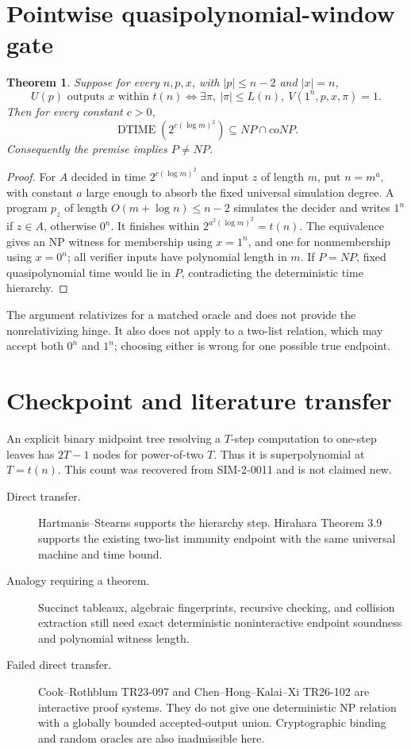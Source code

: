 \documentclass[11pt]{article}
\newtheorem{theorem}{Theorem}
\begin{document}
\section{Pointwise quasipolynomial-window gate}
\begin{theorem}
Suppose for every \(n,p,x\), with \(|p|\le n-2\) and \(|x|=n\),
\[
 U(p)\text{ outputs }x\text{ within }t(n)
 \Longleftrightarrow
 \exists\pi,\ |\pi|\le L(n),\ V(1^n,p,x,\pi)=1.
\]
Then for every constant \(c>0\),
\[
 \operatorname{DTIME}(2^{c(\log m)^2})\subseteq NP\cap coNP.
\]
Consequently the premise implies \(P\ne NP\).
\end{theorem}
\begin{proof}
For \(A\) decided in time \(2^{c(\log m)^2}\) and input \(z\) of length \(m\),
put \(n=m^a\), with constant \(a\) large enough to absorb the fixed universal
simulation degree.  A program \(p_z\) of length \(O(m+\log n)\le n-2\)
simulates the decider and writes \(1^n\) if \(z\in A\), otherwise \(0^n\).
It finishes within \(2^{a^2(\log m)^2}=t(n)\).  The equivalence gives an NP
witness for membership using \(x=1^n\), and one for nonmembership using
\(x=0^n\); all verifier inputs have polynomial length in \(m\).
If \(P=NP\), fixed quasipolynomial time would lie in \(P\), contradicting
the deterministic time hierarchy.
\end{proof}
The argument relativizes for a matched oracle and does not provide the
nonrelativizing hinge.  It also does not apply to a two-list relation, which
may accept both \(0^n\) and \(1^n\); choosing either is wrong for one possible
true endpoint.

\section{Checkpoint and literature transfer}
An explicit binary midpoint tree resolving a \(T\)-step computation to
one-step leaves has \(2T-1\) nodes for power-of-two \(T\).  Thus it is
superpolynomial at \(T=t(n)\).  This count was recovered from SIM-2-0011 and
is not claimed new.
\begin{description}
\item[Direct transfer.] Hartmanis--Stearns supports the hierarchy step.
Hirahara Theorem 3.9 supports the existing two-list immunity endpoint with
the same universal machine and time bound.
\item[Analogy requiring a theorem.] Succinct tableaux, algebraic
fingerprints, recursive checking, and collision extraction still need exact
deterministic noninteractive endpoint soundness and polynomial witness length.
\item[Failed direct transfer.] Cook--Rothblum TR23-097 and
Chen--Hong--Kalai--Xi TR26-102 are interactive proof systems.  They do not
give one deterministic NP relation with a globally bounded accepted-output
union.  Cryptographic binding and random oracles are also inadmissible here.
\end{description}
\end{document}
